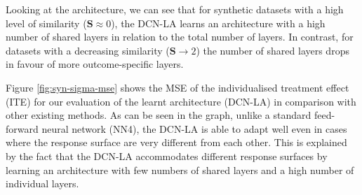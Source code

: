 Looking at the architecture, we can see that for synthetic datasets with a high level of similarity ($\mathbf{S} \approx 0$), the DCN-LA learns an architecture with a high number of shared layers in relation to the total number of layers. In contrast, for datasets with a decreasing similarity ($\mathbf{S} \rightarrow 2$) %
the number of shared layers drops in favour of more outcome-specific layers. 

Figure \ref{fig:syn-sigma-mse} shows the MSE of the individualised treatment effect (ITE) for our evaluation of the learnt architecture (DCN-LA) in comparison with other existing methods. As can be seen in the graph, unlike a standard feed-forward neural network (NN4), the DCN-LA is able to adapt well even in cases where the response surface are very different from each other. This is explained by the fact that the DCN-LA accommodates different response surfaces by learning an architecture with few numbers of shared layers and a high number of individual layers. \\
